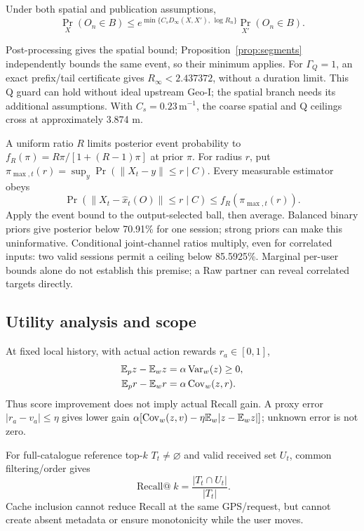 \begin{theorem}\label{thm:endtoend}
Under both spatial and publication assumptions,
\begin{equation}
\Pr_X(O_n\in B)\le
e^{\min\{C_sD_\infty(X,X'),\,\log R_n\}}\Pr_{X'}(O_n\in B). \label{eq:endtoend}
\end{equation}
\end{theorem}
\noindent
Post-processing gives the spatial bound; Proposition~\ref{prop:segments}
independently bounds the same event, so their minimum applies.
For $\Gamma_Q=1$, an exact prefix/tail certificate gives
$R_\infty<2.437372$, without a duration limit.
This Q guard can hold without ideal upstream Geo-I; the spatial branch needs
its additional assumptions. With $C_s=0.23\,\mathrm m^{-1}$, the coarse spatial
and Q ceilings cross at approximately 3.874 m.

A uniform ratio $R$ limits posterior event probability to
$f_R(\pi)=R\pi/[1+(R-1)\pi]$ at prior $\pi$.
For radius $r$, put
$\pi_{\max,t}(r)=\sup_y\Pr(\|X_t-y\|\le r\mid C)$.
Every measurable estimator obeys
\begin{equation}
\Pr(\|X_t-\widehat x_t(O)\|\le r\mid C)
\le f_R(\pi_{\max,t}(r)). \label{eq:hit}
\end{equation}
Apply the event bound to the output-selected ball, then average.
Balanced binary priors give posterior below 70.91\% for one session;
strong priors can make this uninformative. Conditional joint-channel ratios
multiply, even for correlated inputs: two valid sessions permit a ceiling
below 85.5925\%. Marginal per-user bounds alone do not establish this premise;
a Raw partner can reveal correlated targets directly.

\subsection{Utility analysis and scope}\label{sec:utility}
At fixed local history, with actual action rewards $r_a\in[0,1]$,
\begin{align}
\mathbb E_pz-\mathbb E_wz&=\alpha\operatorname{Var}_w(z)\ge0,\\
\mathbb E_pr-\mathbb E_wr&=\alpha\operatorname{Cov}_w(z,r). \label{eq:gain}
\end{align}
Thus score improvement does not imply actual Recall gain.
A proxy error $|r_a-v_a|\le\eta$ gives lower gain
$\alpha[\operatorname{Cov}_w(z,v)-\eta\mathbb E_w|z-\mathbb E_wz|]$; unknown error is not zero.

For full-catalogue reference top-$k$ $T_t\ne\varnothing$ and valid received
set $U_t$, common filtering/order gives
\begin{equation}
\operatorname{Recall@}k=\frac{|T_t\cap U_t|}{|T_t|}. \label{eq:recall}
\end{equation}
Cache inclusion cannot reduce Recall at the same GPS/request, but cannot
create absent metadata or ensure monotonicity while the user moves.

